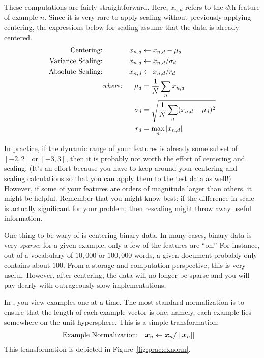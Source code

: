 
These computations are fairly straightforward.  Here, $x_{n,d}$ refers
to the $d$th feature of example $n$.  Since it is very rare to apply
scaling without previously applying centering, the expressions below
for scaling assume that the data is already centered.
\begin{align}
\text{Centering:} && x_{n,d} &\leftarrow x_{n,d} - \mu_d \\
\text{Variance Scaling:} && x_{n,d} &\leftarrow x_{n,d} / \sigma_d \\
\text{Absolute Scaling:} && x_{n,d} &\leftarrow x_{n,d} / r_d \\
&\textit{where:}
& \mu_d &= \frac 1 N \sum_n x_{n,d} \\
&& \sigma_d &= \sqrt{ \frac 1 N \sum_n (x_{n,d} - \mu_d)^2 } \\
&& r_d   &= \max_n \left\vert x_{n,d} \right\vert
\end{align}


In practice, if the dynamic range of your features is already some
subset of $[-2,2]$ or $[-3,3]$, then it is probably not worth the
effort of centering and scaling.  (It's an effort because you have to
keep around your centering and scaling calculations so that you can
apply them to the test data as well!)  However, if some of your
features are orders of magnitude larger than others, it might be
helpful.  Remember that you might know best: if the difference in
scale is actually significant for your problem, then rescaling might
throw away useful information.

One thing to be wary of is centering binary data.  In many cases,
binary data is very \emph{sparse}: for a given example, only a few of
the features are ``on.''  For instance, out of a vocabulary of
$10,000$ or $100,000$ words, a given document probably only contains
about $100$.  From a storage and computation perspective, this is very
useful.  However, after centering, the data will no longer be sparse and
you will pay dearly with outrageously slow implementations.


In , you view examples one at a time.
The most standard normalization is to ensure that the length of each
example vector is one: namely, each example lies somewhere on the unit
hypersphere.  This is a simple transformation:
\begin{align}
\text{Example Normalization:} && {\boldsymbol{x}}_{n} &\leftarrow {\boldsymbol{x}}_{n} / \left\vert\left\vert {\boldsymbol{x}}_n \right\vert\right\vert
\end{align}
This transformation is depicted in Figure~\ref{fig:prac:exnorm}.

